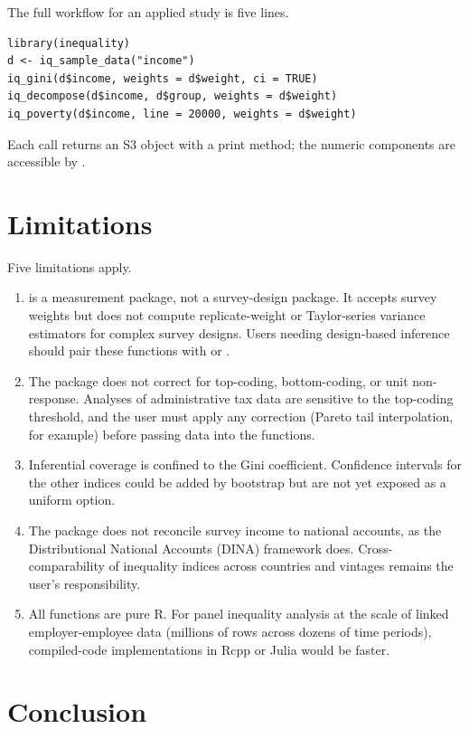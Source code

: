 The full workflow for an applied study is five lines.

\begin{verbatim}
library(inequality)
d <- iq_sample_data("income")
iq_gini(d$income, weights = d$weight, ci = TRUE)
iq_decompose(d$income, d$group, weights = d$weight)
iq_poverty(d$income, line = 20000, weights = d$weight)
\end{verbatim}

Each call returns an S3 object with a print method; the numeric
components are accessible by \code{\$}.

\section{Limitations}\label{limitations}

Five limitations apply.

\begin{enumerate}
\def\labelenumi{\arabic{enumi}.}
\tightlist
\item
   is a measurement package, not a survey-design
  package. It accepts survey weights but does not compute
  replicate-weight or Taylor-series variance estimators for complex
  survey designs. Users needing design-based inference should pair
  these functions with  or .
\item
  The package does not correct for top-coding, bottom-coding, or
  unit non-response. Analyses of administrative tax data are
  sensitive to the top-coding threshold, and the user must apply
  any correction (Pareto tail interpolation, for example) before
  passing data into the functions.
\item
  Inferential coverage is confined to the Gini coefficient.
  Confidence intervals for the other indices could be added by
  bootstrap but are not yet exposed as a uniform option.
\item
  The package does not reconcile survey income to national accounts,
  as the Distributional National Accounts (DINA) framework does.
  Cross-comparability of inequality indices across countries and
  vintages remains the user's responsibility.
\item
  All functions are pure R. For panel inequality analysis at the
  scale of linked employer-employee data (millions of rows across
  dozens of time periods), compiled-code implementations in Rcpp or
  Julia would be faster.
\end{enumerate}

\section{Conclusion}\label{conclusion}

